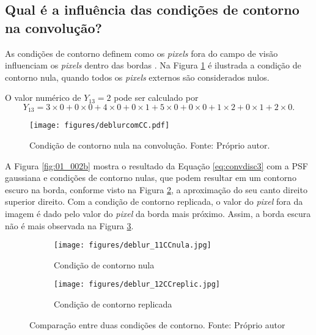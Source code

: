 \subsection{Qual é a influência das condições de contorno na convolução?}
As condições de contorno definem como os \textit{pixels} fora do campo de visão influenciam os \textit{pixels} dentro das bordas \cite{hansen2006deblurring}. Na Figura \ref{fig:deblur2} é ilustrada a condição de contorno nula, quando todos os \textit{pixels} externos são considerados nulos. 

O valor numérico de $Y_{13} = 2$ pode ser calculado por
\begin{equation} 
Y_{13} = 3 \times 0 + 0 \times 0 + 4\times 0 + 0 \times 1 + 5 \times 0 + 0\times 0 + 1 \times 2 + 0 \times 1 + 2 \times 0.
\end{equation}
\begin{figure}[H]
\centering
\texttt{[image: figures/deblurcomCC.pdf]}
\caption[Condição de contorno nula na convolução.]{Condição de contorno nula na convolução. Fonte: Próprio autor.}
\label{fig:deblur2}
\end{figure}

A Figura \ref{fig:01_002b} mostra o resultado da Equação \eqref{eq:convdisc3} com a PSF gaussiana e condições de contorno nulas, que podem resultar em um contorno escuro na borda, conforme visto na Figura \ref{fig:01_003a}, a aproximação do seu canto direito superior direito. Com a condição de contorno replicada, o valor do \textit{pixel} fora da imagem é dado pelo valor do \textit{pixel} da borda mais próximo. Assim, a borda escura não é mais observada na Figura \ref{fig:01_003b}. 

\begin{figure}[H]
     \centering
     \begin{subfigure}[b]{0.37\textwidth}
         \centering
         \texttt{[image: figures/deblur\_11CCnula.jpg]}
         \caption{Condição de contorno nula}
         \label{fig:01_003a}
     \end{subfigure}     
     \begin{subfigure}[b]{0.37\textwidth}
         \centering
                  \texttt{[image: figures/deblur\_12CCreplic.jpg]}
         \caption{Condição de contorno replicada}
         \label{fig:01_003b}
     \end{subfigure}
\caption[Comparação entre duas condições de contorno.]{Comparação entre duas condições de contorno. Fonte: Próprio autor}
\label{fig:01_003}
\end{figure}




